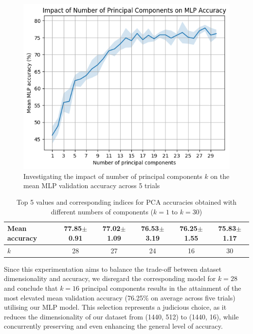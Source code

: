 \documentclass[11pt, a4paper]{report}
\begin{document}
\begin{figure}[H]
    \centering
    \includegraphics[scale=0.55]{docs/Project Report/Media/5_4_1_mlp_pca_accuracy_analysis.png}
    \caption{Investigating the impact of number of principal components $k$ on the mean MLP validation accuracy across 5 trials}
    \label{fig:5.5}
\end{figure}
\begin{table}[H]
    \centering
    \begin{tabular}{lccccc}
        \toprule
        Mean accuracy & 77.85$\pm$0.91 & 77.02$\pm$1.09 & 76.53$\pm$3.19 & 76.25$\pm$1.55 & 75.83$\pm$1.17 \\
        \midrule
        $k$ & 28 & 27 & 24 & 16 & 30 \\
        \bottomrule
    \end{tabular}
    \caption{Top 5 values and corresponding indices for PCA accuracies obtained with different numbers of components ($k=1$ to $k=30$)}
    \label{tb:5.4}
\end{table}
Since this experimentation aims to balance the trade-off between dataset dimensionality and accuracy, we disregard the corresponding model for $k=28$ and conclude that $k=16$ principal components results in the attainment of the most elevated mean validation accuracy (76.25\% on average across five trials) utilising our MLP model. This selection represents a judicious choice, as it reduces the dimensionality of our dataset from (1440, 512) to (1440, 16), while concurrently preserving and even enhancing the general level of accuracy.
\end{document}
